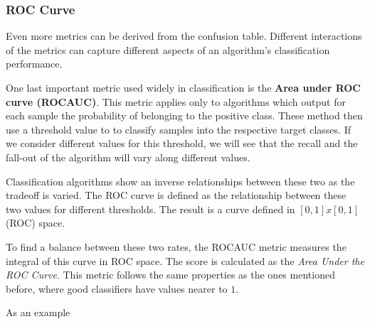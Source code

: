 \documentclass{article}%
\theoremstyle{definition}
\begin{document}
\subsubsection{ROC Curve}

Even more metrics can be derived from the confusion table. Different interactions of the metrics can capture different aspects of an algorithm's classification performance. 

One last important metric used widely in classification is the  \textbf{Area under ROC curve (ROCAUC)}. This metric applies only to algorithms which output for each sample  the probability of belonging to the positive class.  These method then use a threshold value to to classify samples into the respective target classes. If we consider different values for this threshold, we will see that the recall and the fall-out of the algorithm will vary along different values. 

Classification algorithms show an inverse relationships between these two as the tradeoff is varied. The ROC curve is defined as the relationship between these two values for different thresholds. The result is a curve defined in $[0,1]x[0,1]$ (ROC) space.

To find a balance between these two rates, the ROCAUC metric measures the integral of this curve in ROC space. The score is calculated as the \textit{Area Under the ROC Curve}. This metric follows the same properties as the ones mentioned before, where good classifiers have values nearer to $1$. 

As an example
\end{document}
